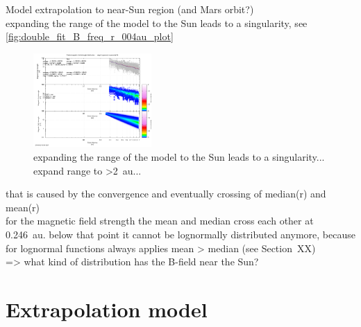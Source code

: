 Model extrapolation to near-Sun region (and Mars orbit?)\\

expanding the range of the model to the Sun leads to a singularity, see \autoref{fig:double_fit_B_freq_r_004au_plot}
\begin{figure}[htb]
	\centering
	\includegraphics[width=0.4\textwidth]{images/gnuplots/double_fit_B_freq_r_004au_plot.png}
	\caption{expanding the range of the model to the Sun leads to a singularity... expand range to >2~au...}
	\label{fig:double_fit_B_freq_r_004au_plot}
\end{figure}
that is caused by the convergence and eventually crossing of median(r) and mean(r)\\

for the magnetic field strength the mean and median cross each other at 0.246~au. below that point it cannot be lognormally distributed anymore, because for lognormal functions always applies mean > median (see Section~XX)\\
=> what kind of distribution has the B-field near the Sun?\\


\section{Extrapolation model}


